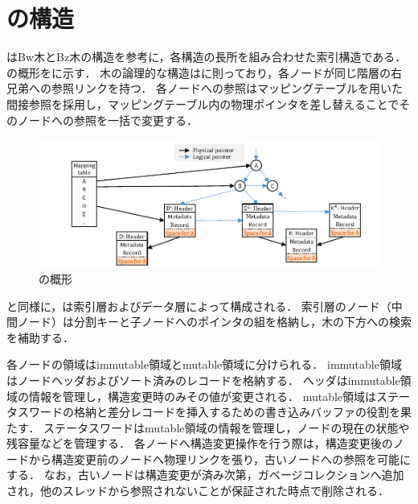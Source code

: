 \section{\Bctree{}の構造}
\label{sec:bc_tree_structure}

\Bctree{}はBw木とBz木の構造を参考に，各構造の長所を組み合わせた索引構造である．
\Bctree{}の概形を\Fig{\ref{fig:bc_tree-structure}}に示す．
木の論理的な構造は\Blinktree{}に則っており，各ノードが同じ階層の右兄弟への参照リンクを持つ．
各ノードへの参照はマッピングテーブルを用いた間接参照を採用し，マッピングテーブル内の物理ポインタを差し替えることでそのノードへの参照を一括で変更する．

\begin{figure}[t]
    \centering
    \includegraphics{./figures/Bc-structure.pdf}
    \caption{\Bctree{}の概形}
    \label{fig:bc_tree-structure}
\end{figure}

\Bptree{}と同様に，\Bctree{}は索引層およびデータ層によって構成される．
索引層のノード（中間ノード）は分割キーと子ノードへのポインタの組を格納し，木の下方への検索を補助する．

各ノードの領域はimmutable領域とmutable領域に分けられる．
immutable領域はノードヘッダおよびソート済みのレコードを格納する．
ヘッダはimmutable領域の情報を管理し，構造変更時のみその値が変更される．
mutable領域はステータスワードの格納と差分レコードを挿入するための書き込みバッファの役割を果たす．
ステータスワードはmutable領域の情報を管理し，ノードの現在の状態や残容量などを管理する．
各ノードへ構造変更操作を行う際は，構造変更後のノードから構造変更前のノードへ物理リンクを張り，古いノードへの参照を可能にする．
なお，古いノードは構造変更が済み次第，ガベージコレクションへ追加され，他のスレッドから参照されないことが保証された時点で削除される．

